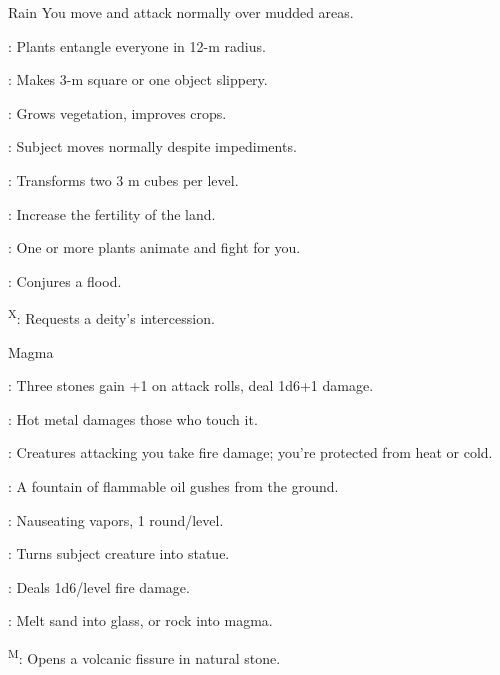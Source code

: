 {Rain}
{You move and attack normally over mudded areas.}
{
	\item {}: Plants entangle everyone in 12-m radius.
	\item {}: Makes 3-m square or one object slippery.
	\item {}: Grows vegetation, improves crops.
	\item {}: Subject moves normally despite impediments.
	\item {}: Transforms two 3 m cubes per level.
	\item {}: Increase the fertility of the land.
	\item {}: One or more plants animate and fight for you.
	\item {}: Conjures a flood.
	\item {}\textsuperscript{X}: Requests a deity's intercession.
}

{Magma}
{}
{
	\item {}: Three stones gain +1 on attack rolls, deal 1d6+1 damage.
	\item {}: Hot metal damages those who touch it.
	\item {}: Creatures attacking you take fire damage; you're protected from heat or cold.
	\item {}: A fountain of flammable oil gushes from the ground.
	\item {}: Nauseating vapors, 1 round/level.
	\item {}: Turns subject creature into statue.
	\item {}: Deals 1d6/level fire damage.
	\item {}: Melt sand into glass, or rock into magma.
	\item {}\textsuperscript{M}: Opens a volcanic fissure in natural stone.
}

